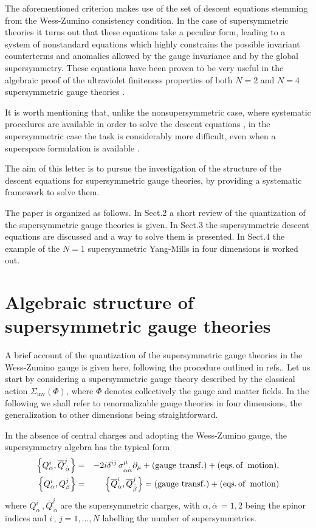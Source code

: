 \documentclass[a4paper,12pt]{article}
\begin{document}
The aforementioned criterion makes use of the set of descent equations
stemming from the Wess-Zumino consistency condition. In the case of
supersymmetric theories it turns out that these equations take a peculiar
form, leading to a system of nonstandard equations which highly constrains
the possible invariant counterterms and anomalies allowed by the gauge
invariance and by the global supersymmetry. These equations have been proven
to be very useful in the algebraic proof of the ultraviolet finiteness
properties of both $N=2$ \cite{n2} and $N=4$ supersymmetric gauge theories 
\cite{n4,n41}.

It is worth mentioning that, unlike the nonsupersymmetric case, where
systematic procedures are available in order to solve the descent equations 
\cite{book,pr}, in the supersymmetric case the task is considerably more
difficult, even when a superspace formulation is available \cite{sp}.

The aim of this letter is to pursue the investigation of the structure of
the descent equations for supersymmetric gauge theories, by providing a
systematic framework to solve them.

The paper is organized as follows. In Sect.2 a short review of the
quantization of the supersymmetric gauge theories is given. In Sect.3 the
supersymmetric descent equations are discussed and a way to solve them is
presented. In Sect.4 the example of the $N=1$ supersymmetric Yang-Mills in
four dimensions is worked out.

\section{Algebraic structure of supersymmetric gauge theories}

A brief account of the quantization of the supersymmetric gauge theories in
the Wess-Zumino gauge is given here, following the procedure outlined in
refs.\cite{n4,mg,mp}. Let us start by considering a supersymmetric gauge
theory described by the classical action $\Sigma _{\mathrm{inv}}(\Phi )$,
where $\Phi $ denotes collectively the gauge and matter fields. In the
following we shall refer to renormalizable gauge theories in four
dimensions, the generalization to other dimensions being straightforward.

In the absence of central charges and adopting the Wess-Zumino gauge, the
supersymmetry algebra has the typical form 
\begin{eqnarray}
\left\{ Q_{\alpha }^{i},\overline{Q}_{\,\stackrel{.}{\alpha }}^{j}\right\}
&=&-2i\delta ^{ij}\,\sigma _{\alpha \stackrel{.}{\alpha }}^{\mu }\partial
_{\mu }+\mathrm{(gauge\,\,transf.)}+\mathrm{(eqs.\,of\,\,\,motion)}, 
\nonumber \\
\left\{ Q_{\alpha }^{i},Q_{\beta }^{j}\right\} &=&\left\{ \overline{Q}_{%
\stackrel{.}{\alpha }}^{i},\overline{Q}_{\stackrel{.}{\beta }}^{j}\right\} =%
\mathrm{(gauge\,\,transf.)}+\mathrm{(eqs.\,of\,\,\,motion)}  \label{salg}
\end{eqnarray}
where $Q_{\alpha }^{i}\,,\overline{Q}_{\,\stackrel{.}{\alpha }}^{j}$ are the
supersymmetric charges, with $\alpha ,\stackrel{.}{\alpha }\,=1,2$ being the
spinor indices and $i\,,\,j=1,...,N$ labelling the number of supersymmetries.
\end{document}

